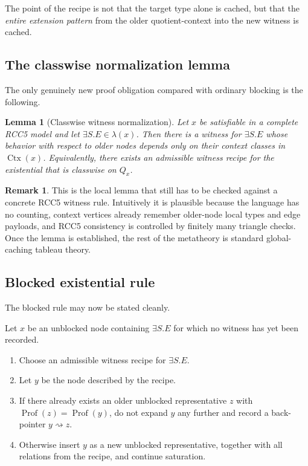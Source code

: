 \documentclass[11pt]{article}
\newtheorem{lemma}[theorem]{Lemma}
\theoremstyle{definition}
\newtheorem{remark}[theorem]{Remark}
\newcommand{\Prof}{\operatorname{Prof}}
\newcommand{\Ctx}{\operatorname{Ctx}}
\begin{document}
The point of the recipe is not that the target type alone is cached, but that the \emph{entire extension pattern} from the older quotient-context into the new witness is cached.

\subsection{The classwise normalization lemma}

The only genuinely new proof obligation compared with ordinary blocking is the following.

\begin{lemma}[Classwise witness normalization]\label{lem:normalization}
Let $x$ be satisfiable in a complete RCC5 model and let $\exists S.E\in\lambda(x)$. Then there is a witness for $\exists S.E$ whose behavior with respect to older nodes depends only on their context classes in $\Ctx(x)$. Equivalently, there exists an admissible witness recipe for the existential that is classwise on $Q_x$.
\end{lemma}

\begin{remark}
This is the local lemma that still has to be checked against a concrete RCC5 witness rule. Intuitively it is plausible because the language has no counting, context vertices already remember older-node local types and edge payloads, and RCC5 consistency is controlled by finitely many triangle checks. Once the lemma is established, the rest of the metatheory is standard global-caching tableau theory.
\end{remark}

\subsection{Blocked existential rule}

The blocked rule may now be stated cleanly.

\begin{tcolorbox}[colback=gray!3,colframe=gray!50!black,title=Blocked existential rule]
Let $x$ be an unblocked node containing $\exists S.E$ for which no witness has yet been recorded.
\begin{enumerate}[label=\arabic*.]
  \item Choose an admissible witness recipe for $\exists S.E$.
  \item Let $y$ be the node described by the recipe.
  \item If there already exists an older unblocked representative $z$ with $\Prof(z)=\Prof(y)$, do not expand $y$ any further and record a back-pointer $y\rightsquigarrow z$.
  \item Otherwise insert $y$ as a new unblocked representative, together with all relations from the recipe, and continue saturation.
\end{enumerate}
\end{tcolorbox}
\end{document}

